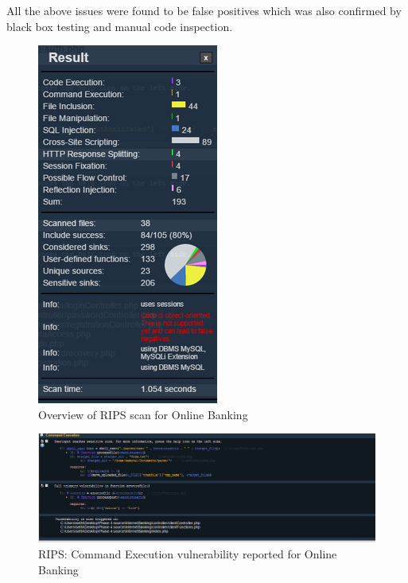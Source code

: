 All the above issues were found to be false positives which was also confirmed by black box testing and manual code inspection.

\begin{figure}[ht]
	\centering
	\includegraphics[width=.6\linewidth]{figures/rips_overview.png}
	\caption{Overview of RIPS scan for Online Banking}
	\label{fig:rips_overview}
\end{figure}

\begin{figure}[ht]
	\centering
	\includegraphics[width=.8\linewidth]{figures/rips_command_execution.png}
	\caption{RIPS: Command Execution vulnerability reported for Online Banking}
	\label{fig:rips_command_execution}
\end{figure}

